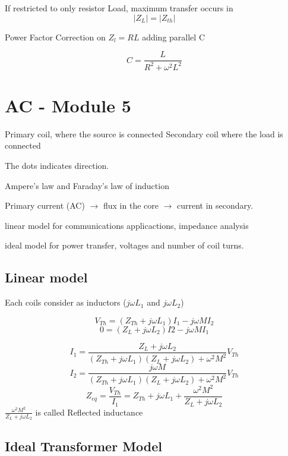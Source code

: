\documentclass[]{article}
\begin{document}
If restricted to only resistor Load, maximum transfer occurs in
$$|Z_L|=|Z_{th}|$$

Power Factor Correction on $Z_l=RL$ adding parallel C

$$C=\frac{L}{R^2+\omega^2L^2}$$
\section{AC - Module 5}
Primary coil, where the source is connected
Secondary coil where the load is connected

The dots indicates direction. 

Ampere's law and Faraday's law of induction

Primary current (AC) $\rightarrow$ flux in the core $\rightarrow$ current in secondary.

linear model for communications applicactions, impedance analysis

ideal model for power transfer, voltages and number of coil turns.


\subsection{Linear model}
Each coils consider as inductors ($j\omega L_1$ and $j\omega L_2$)



$$ V_{Th}=(Z_{Th}+j\omega L_1)I_1- j\omega MI_2 $$
$$ 0 = (Z_L + j\omega L_2)I2 - j\omega MI_1$$

$$I_1= \frac{Z_L+j\omega L_2}{(Z_{Th} + j\omega L_1)(Z_L + j\omega L_2)+\omega^2M^2}V_{Th}$$
$$I_2= \frac{j\omega M}{(Z_{Th} + j\omega L_1)(Z_L + j\omega L_2)+\omega^2M^2}V_{Th}$$
$$Z_{eq}=\frac{V_{Th }}{I_1}=Z_{Th}+j\omega L_1 + \frac{\omega^2M^2}{Z_L+j\omega L_2}$$
$\frac{\omega^2M^2}{Z_L+j\omega L_2}$ is called Reflected inductance

\subsection{Ideal Transformer Model}
\end{document}
